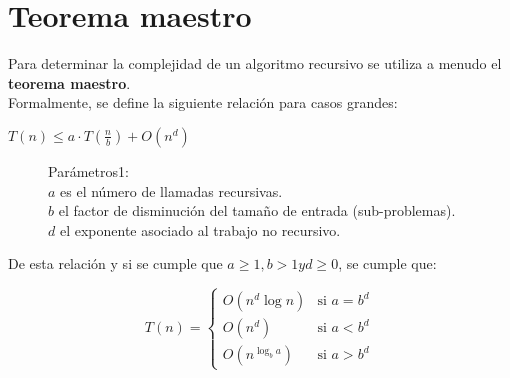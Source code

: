 \section{Teorema maestro}
Para determinar la complejidad de un algoritmo recursivo se utiliza
a menudo el \textbf{teorema maestro}.\\

Formalmente, se define la siguiente relación para casos grandes:

\begin{center}
  \(T(n) \leq a \cdot T\left(\frac{n}{b}\right) + O(n^{d})\)\\
  \begin{figure}[h]
    Parámetros1:\\
    $a$ es el número de llamadas recursivas.\\
    $b$ el factor de disminución del tamaño de entrada (sub-problemas).\\
    $d$ el exponente asociado al trabajo no recursivo.
  \end{figure}
\end{center}

De esta relación y si se cumple que $a \geq 1, b > 1 y d \geq 0$, se cumple que:

\begin{center}
  \[
    T(n) =
    \begin{cases}
      O(n^{d} \log n) & \text{si } a = b^{d} \\
      O(n^{d}) & \text{si } a < b^{d} \\
      O(n^{\log_{b} a}) & \text{si } a > b^{d}
    \end{cases}
  \]
\end{center}
